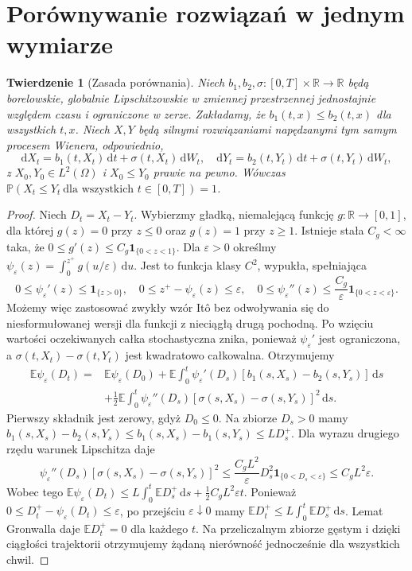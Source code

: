 \documentclass[11pt,a4paper,oneside]{report}
\numberwithin{equation}{chapter}
\theoremstyle{plain}
\newtheorem{twierdzenie}{Twierdzenie}[chapter]
\theoremstyle{definition}
\theoremstyle{remark}
\newcommand{\R}{\mathbb{R}}
\newcommand{\Prob}{\mathbb{P}}
\newcommand{\E}{\mathbb{E}}
\newcommand{\ind}[1]{\mathbf{1}_{#1}}
\newcommand{\dd}{\mathrm{d}}
\begin{document}
\section{Porównywanie rozwiązań w jednym wymiarze}\label{sec:volIII:06:05}
\begin{twierdzenie}[Zasada porównania]\label{thm:volIII:06:05}
\label{th:sde-comparison}
Niech $b_1,b_2,\sigma:[0,T]\times\R\to\R$
będą borelowskie, globalnie Lipschitzowskie w
zmiennej przestrzennej jednostajnie względem czasu
i ograniczone w zerze. Zakładamy, że
$b_1(t,x)\le b_2(t,x)$ dla wszystkich $t,x$.
Niech $X,Y$ będą silnymi rozwiązaniami napędzanymi
tym samym procesem Wienera, odpowiednio,
\[
\dd X_t=b_1(t,X_t)\,\dd t+\sigma(t,X_t)\,\dd W_t,
\quad
\dd Y_t=b_2(t,Y_t)\,\dd t+\sigma(t,Y_t)\,\dd W_t,
\]
z $X_0,Y_0\in L^2(\Omega)$ i $X_0\le Y_0$ prawie
na pewno. Wówczas
$\Prob(X_t\le Y_t\ \text{dla wszystkich }t\in[0,T])=1$.
\end{twierdzenie}
\begin{proof}
Niech $D_t=X_t-Y_t$. Wybierzmy gładką, niemalejącą
funkcję $g:\R\to[0,1]$, dla której $g(z)=0$
przy $z\le0$ oraz $g(z)=1$ przy $z\ge1$.
Istnieje stała $C_g<\infty$ taka, że
$0\le g'(z)\le C_g\ind{\{0<z<1\}}$.
Dla $\varepsilon>0$ określmy
$\psi_\varepsilon(z)=\int_0^{z^+}g(u/\varepsilon)\,\dd u$.
Jest to funkcja klasy $C^2$, wypukła, spełniająca
\[
0\le\psi_\varepsilon'(z)\le\ind{\{z>0\}},\quad
0\le z^+-\psi_\varepsilon(z)\le\varepsilon,\quad
0\le\psi_\varepsilon''(z)\le
\frac{C_g}{\varepsilon}\ind{\{0<z<\varepsilon\}}.
\]
Możemy więc zastosować zwykły wzór Itô bez
odwoływania się do niesformułowanej wersji dla
funkcji z nieciągłą drugą pochodną. Po wzięciu
wartości oczekiwanych
całka stochastyczna znika, ponieważ
$\psi_\varepsilon'$ jest ograniczona, a
$\sigma(t,X_t)-\sigma(t,Y_t)$ jest kwadratowo
całkowalna. Otrzymujemy
\[
\begin{split}
\E\psi_\varepsilon(D_t)
=&\E\psi_\varepsilon(D_0)
+\E\int_0^t\psi_\varepsilon'(D_s)
[b_1(s,X_s)-b_2(s,Y_s)]\,\dd s\\
&+\frac12\E\int_0^t\psi_\varepsilon''(D_s)
[\sigma(s,X_s)-\sigma(s,Y_s)]^2\,\dd s.
\end{split}
\]
Pierwszy składnik jest zerowy, gdyż $D_0\le0$.
Na zbiorze $D_s>0$ mamy
$b_1(s,X_s)-b_2(s,Y_s)
\le b_1(s,X_s)-b_1(s,Y_s)\le L D_s^+$.
Dla wyrazu drugiego rzędu warunek Lipschitza daje
\[
\psi_\varepsilon''(D_s)
[\sigma(s,X_s)-\sigma(s,Y_s)]^2
\le \frac{C_gL^2}{\varepsilon}D_s^2
\ind{\{0<D_s<\varepsilon\}}\le C_gL^2\varepsilon.
\]
Wobec tego
$\E\psi_\varepsilon(D_t)
\le L\int_0^t\E D_s^+\,\dd s+
\tfrac12 C_gL^2\varepsilon t$.
Ponieważ $0\le D_t^+-\psi_\varepsilon(D_t)\le\varepsilon$,
po przejściu $\varepsilon\downarrow0$ mamy
$\E D_t^+\le L\int_0^t\E D_s^+\,\dd s$.
Lemat Gronwalla daje $\E D_t^+=0$ dla każdego $t$.
Na przeliczalnym zbiorze gęstym i dzięki ciągłości
trajektorii otrzymujemy żądaną nierówność
jednocześnie dla wszystkich chwil.
\end{proof}
\end{document}
